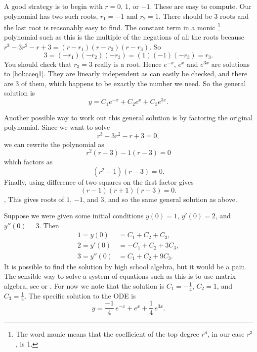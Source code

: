 \documentclass{ximera}
\begin{document}
\begin{exampleSol}
    A good strategy is to begin with $r=0$, $1$, or $-1$.  These are easy to compute. Our polynomial has two such roots, $r_1 = -1$ and $r_2 = 1$.  There should be 3 roots and the last root is reasonably easy to find.  The constant term in a monic%
    \footnote{The word monic means that the coefficient of the top degree $r^d$, in our case $r^3$, is 1.}
    polynomial such as this is the multiple of the negations of all the roots because $r^3 - 3 r^2 - r + 3 = (r-r_1)(r-r_2)(r-r_3)$. So
    \begin{equation*}
        3 = (-r_1)(-r_2)(-r_3) = (1)(-1)(-r_3) = r_3 .
    \end{equation*}
    You should check that $r_3 = 3$ really is a root.  Hence $e^{-x}$, $e^{x}$ and $e^{3x}$ are solutions to \eqref{hol:cceq1}.  They are linearly independent as can easily be checked, and there are 3 of them, which happens to be exactly the number we need.  So the general solution is
    \begin{equation*}
        y = C_1 e^{-x} + C_2 e^{x} + C_3 e^{3x} .
    \end{equation*}
    
    Another possible way to work out this general solution is by factoring the original polynomial. Since we want to solve 
    \[ 
        r^3 - 3r^2 - r + 3 = 0,
    \] 
    we can rewrite the polynomial as
    \[ 
        r^2(r-3) -1(r-3) = 0 
    \] 
    which factors as
    \[ 
        (r^2 - 1)(r-3) = 0. 
    \] 
    Finally, using difference of two squares on the first factor gives
    \[ 
        (r-1)(r+1)(r-3) = 0 .
    \] ,
    This gives roots of $1$, $-1$, and $3$, and so the same general solution as above.
    
    Suppose we were given some initial conditions $y(0) = 1$, $y'(0) = 2$, and $y''(0) = 3$.  Then
    \begin{align*}
        1 = y(0) & = C_1 + C_2 + C_3 , \\
        2 = y'(0) & = -C_1 + C_2 + 3C_3 , \\
        3 = y''(0) & = C_1 + C_2 + 9C_3 .
    \end{align*}
    It is possible to find the solution by high school algebra, but it would be a pain. The sensible way to solve a system of equations such as this is to use matrix algebra, see  or . For now we note that the solution is $C_1 = -\frac{1}{4}$, $C_2 = 1$, and $C_3 = \frac{1}{4}$.  The specific solution to the ODE is
    \begin{equation*}
        y = \frac{-1}{4}\, e^{-x} + e^x + \frac{1}{4}\, e^{3x} .
    \end{equation*}
\end{exampleSol}
\end{document}
